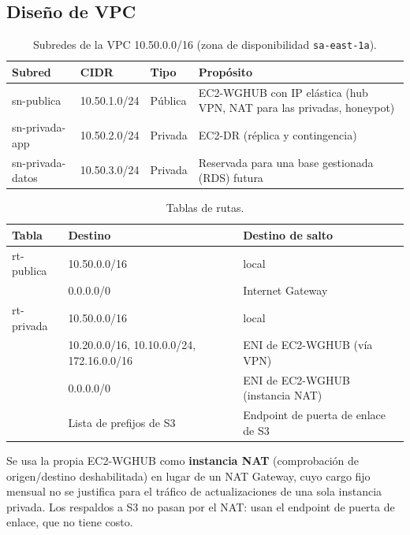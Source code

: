 \subsection{Diseño de VPC}

\begin{table}[H]
\centering
\caption{Subredes de la VPC 10.50.0.0/16 (zona de disponibilidad \texttt{sa-east-1a}).}
\label{tab:ce03-subredes}
\small
\begin{tabularx}{\textwidth}{L{2.6cm}L{2.2cm}L{1.6cm}X}
\toprule
\textbf{Subred} & \textbf{CIDR} & \textbf{Tipo} & \textbf{Propósito} \\
\midrule
sn-publica & 10.50.1.0/24 & Pública & EC2-WGHUB con IP elástica (hub VPN, NAT para las privadas, honeypot) \\
sn-privada-app & 10.50.2.0/24 & Privada & EC2-DR (réplica y contingencia) \\
sn-privada-datos & 10.50.3.0/24 & Privada & Reservada para una base gestionada (RDS) futura \\
\bottomrule
\end{tabularx}
\end{table}

\begin{table}[htbp]
\centering
\caption{Tablas de rutas.}
\label{tab:ce03-rutas}
\small
\begin{tabularx}{\textwidth}{L{2.4cm}L{4.4cm}X}
\toprule
\textbf{Tabla} & \textbf{Destino} & \textbf{Destino de salto} \\
\midrule
rt-publica & 10.50.0.0/16 & local \\
 & 0.0.0.0/0 & Internet Gateway \\
rt-privada & 10.50.0.0/16 & local \\
 & 10.20.0.0/16, 10.10.0.0/24, 172.16.0.0/16 & ENI de EC2-WGHUB (vía VPN) \\
 & 0.0.0.0/0 & ENI de EC2-WGHUB (instancia NAT) \\
 & Lista de prefijos de S3 & Endpoint de puerta de enlace de S3 \\
\bottomrule
\end{tabularx}
\end{table}

\noindent Se usa la propia EC2-WGHUB como \textbf{instancia NAT} (comprobación de
origen/destino deshabilitada) en lugar de un NAT Gateway, cuyo cargo fijo mensual no
se justifica para el tráfico de actualizaciones de una sola instancia privada. Los
respaldos a S3 no pasan por el NAT: usan el endpoint de puerta de enlace, que no tiene
costo.

